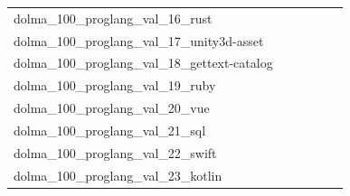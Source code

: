 \documentclass[dvipsnames]{article}
\begin{document}
\begin{appendix}
{\begin{longtable}{m{6cm}m{1.7cm}m{1.7cm}m{1.7cm}m{1.7cm}m{1.7cm}}
	dolma\_100\_proglang\_val\_16\_rust  & \colorbox[HTML]{77c578}{\makebox[\mywidth][c]{1.96}} & \colorbox[HTML]{ecf7b1}{\makebox[\mywidth][c]{2.01}} & \colorbox[HTML]{ffffe5}{\makebox[\mywidth][c]{2.23}} & \colorbox[HTML]{98d485}{\makebox[\mywidth][c]{1.97}} & \colorbox[HTML]{89cd7f}{\makebox[\mywidth][c]{1.96}}\\
	dolma\_100\_proglang\_val\_17\_unity3d-asset  & \colorbox[HTML]{77c578}{\makebox[\mywidth][c]{4.01}} & \colorbox[HTML]{f9fcc6}{\makebox[\mywidth][c]{4.17}} & \colorbox[HTML]{ffffe5}{\makebox[\mywidth][c]{4.56}} & \colorbox[HTML]{e4f4ab}{\makebox[\mywidth][c]{4.10}} & \colorbox[HTML]{bbe395}{\makebox[\mywidth][c]{4.05}}\\
	dolma\_100\_proglang\_val\_18\_gettext-catalog  & \colorbox[HTML]{86cc7e}{\makebox[\mywidth][c]{2.84}} & \colorbox[HTML]{afdd8f}{\makebox[\mywidth][c]{2.87}} & \colorbox[HTML]{ffffe5}{\makebox[\mywidth][c]{3.53}} & \colorbox[HTML]{9dd687}{\makebox[\mywidth][c]{2.86}} & \colorbox[HTML]{77c578}{\makebox[\mywidth][c]{2.83}}\\
	dolma\_100\_proglang\_val\_19\_ruby  & \colorbox[HTML]{c8e89a}{\makebox[\mywidth][c]{2.41}} & \colorbox[HTML]{e8f6ae}{\makebox[\mywidth][c]{2.44}} & \colorbox[HTML]{ffffe5}{\makebox[\mywidth][c]{2.70}} & \colorbox[HTML]{9bd587}{\makebox[\mywidth][c]{2.39}} & \colorbox[HTML]{77c578}{\makebox[\mywidth][c]{2.38}}\\
	dolma\_100\_proglang\_val\_20\_vue  & \colorbox[HTML]{d3eda0}{\makebox[\mywidth][c]{1.95}} & \colorbox[HTML]{e3f4aa}{\makebox[\mywidth][c]{1.95}} & \colorbox[HTML]{ffffe5}{\makebox[\mywidth][c]{2.10}} & \colorbox[HTML]{b7e193}{\makebox[\mywidth][c]{1.94}} & \colorbox[HTML]{77c578}{\makebox[\mywidth][c]{1.93}}\\
	dolma\_100\_proglang\_val\_21\_sql  & \colorbox[HTML]{c3e698}{\makebox[\mywidth][c]{2.18}} & \colorbox[HTML]{f7fcbc}{\makebox[\mywidth][c]{2.23}} & \colorbox[HTML]{ffffe5}{\makebox[\mywidth][c]{2.46}} & \colorbox[HTML]{addd8e}{\makebox[\mywidth][c]{2.17}} & \colorbox[HTML]{77c578}{\makebox[\mywidth][c]{2.16}}\\
	dolma\_100\_proglang\_val\_22\_swift  & \colorbox[HTML]{ceeb9e}{\makebox[\mywidth][c]{1.86}} & \colorbox[HTML]{ebf7b0}{\makebox[\mywidth][c]{1.88}} & \colorbox[HTML]{ffffe5}{\makebox[\mywidth][c]{2.04}} & \colorbox[HTML]{bfe596}{\makebox[\mywidth][c]{1.86}} & \colorbox[HTML]{77c578}{\makebox[\mywidth][c]{1.84}}\\
	dolma\_100\_proglang\_val\_23\_kotlin  & \colorbox[HTML]{98d485}{\makebox[\mywidth][c]{2.05}} & \colorbox[HTML]{daf0a4}{\makebox[\mywidth][c]{2.07}} & \colorbox[HTML]{ffffe5}{\makebox[\mywidth][c]{2.29}} & \colorbox[HTML]{d4eea0}{\makebox[\mywidth][c]{2.07}} & \colorbox[HTML]{77c578}{\makebox[\mywidth][c]{2.04}}\\

\end{longtable}}
\end{appendix}
\end{document}
